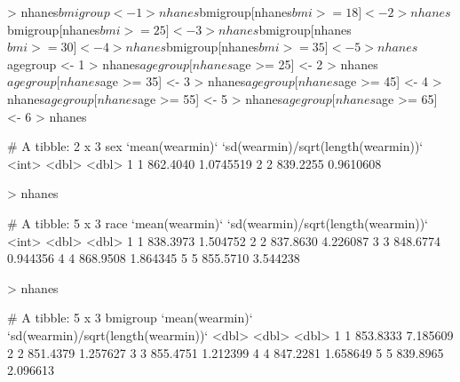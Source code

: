 \documentclass[11pt]{article}
\begin{document}
\begin{Schunk}
\begin{Sinput}
> nhanes$bmigroup <- 1
> nhanes$bmigroup[nhanes$bmi >= 18] <- 2
> nhanes$bmigroup[nhanes$bmi >= 25] <- 3
> nhanes$bmigroup[nhanes$bmi >= 30] <- 4
> nhanes$bmigroup[nhanes$bmi >= 35] <- 5
> nhanes$agegroup <- 1
> nhanes$agegroup[nhanes$age >= 25] <- 2
> nhanes$agegroup[nhanes$age >= 35] <- 3
> nhanes$agegroup[nhanes$age >= 45] <- 4
> nhanes$agegroup[nhanes$age >= 55] <- 5
> nhanes$agegroup[nhanes$age >= 65] <- 6
> nhanes %>% group_by(sex) %>% summarise(mean(wearmin),sd(wearmin)/sqrt(length(wearmin)))
\end{Sinput}
\begin{Soutput}
# A tibble: 2 x 3
    sex `mean(wearmin)` `sd(wearmin)/sqrt(length(wearmin))`
  <int>           <dbl>                               <dbl>
1     1        862.4040                           1.0745519
2     2        839.2255                           0.9610608
\end{Soutput}
\begin{Sinput}
> nhanes %>% group_by(race) %>% summarise(mean(wearmin),sd(wearmin)/sqrt(length(wearmin)))
\end{Sinput}
\begin{Soutput}
# A tibble: 5 x 3
   race `mean(wearmin)` `sd(wearmin)/sqrt(length(wearmin))`
  <int>           <dbl>                               <dbl>
1     1        838.3973                            1.504752
2     2        837.8630                            4.226087
3     3        848.6774                            0.944356
4     4        868.9508                            1.864345
5     5        855.5710                            3.544238
\end{Soutput}
\begin{Sinput}
> nhanes %>% group_by(bmigroup) %>% summarise(mean(wearmin),sd(wearmin)/sqrt(length(wearmin)))
\end{Sinput}
\begin{Soutput}
# A tibble: 5 x 3
  bmigroup `mean(wearmin)` `sd(wearmin)/sqrt(length(wearmin))`
     <dbl>           <dbl>                               <dbl>
1        1        853.8333                            7.185609
2        2        851.4379                            1.257627
3        3        855.4751                            1.212399
4        4        847.2281                            1.658649
5        5        839.8965                            2.096613
\end{Soutput}
\begin{Sinput}

\end{Sinput}
\end{Schunk}
\end{document}
